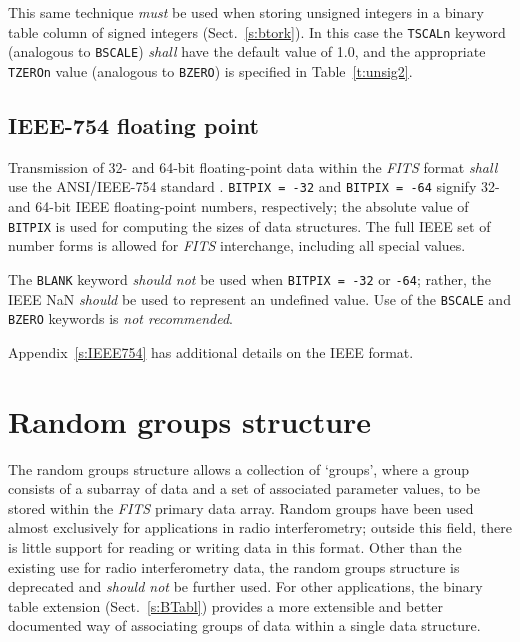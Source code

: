 \documentclass[onecolumn]{aa}
\begin{document}
This same technique {\em must} be used when storing unsigned
integers in a binary table column of signed integers (Sect.\ \ref{s:btork}).  
In this case the {\tt TSCALn} keyword (analogous to {\tt BSCALE}) 
{\em shall} have the default value of 1.0,
and the appropriate {\tt TZEROn} value (analogous to {\tt BZERO})
is specified in Table~\ref{t:unsig2}.

  \subsection{IEEE-754 floating point}
\label{s:FloatingPoint}
    Transmission of 32- and 64-bit floating-point
    data within the {\em FITS\/} 
    format {\em shall} use the ANSI/IEEE-754 standard \citep{ieee85}.
    {\tt BITPIX~=~-32} and 
    {\tt BITPIX~=~-64} signify 32- and 64-bit IEEE 
    floating-point
    numbers, respectively; the absolute value of {\tt BITPIX} 
    is
    used for computing the sizes of data structures. The full 
    IEEE set of number forms is allowed for {\em FITS\/} 
    interchange, including all special
    values.

    The {\tt BLANK} keyword
    {\em should not} be used when {\tt BITPIX~=~-32} or
    {\tt -64}; rather, the IEEE NaN {\em should} be used to represent an
    undefined value.  Use of the {\tt BSCALE} and {\tt BZERO}
    keywords is {\em not recommended}. 

    Appendix~\ref{s:IEEE754} has additional details on the IEEE format.
   

\section{Random groups structure}
    \label{s:Rgrp}

The random groups structure allows a collection of `groups', where a
group consists of a subarray of data and a set of associated
parameter values, to be stored within the {\em FITS} primary data
array.  Random groups have been used almost
exclusively for applications in radio interferometry; outside this
field,  there is little support for reading or writing data in this
format.   Other than the existing use for radio interferometry data,
the random groups structure  is deprecated  and 
{\em should not} be further used. For other applications, the binary table
  extension (Sect.\ \ref{s:BTabl}) provides a
more extensible and better documented way of associating groups of
data within a single data structure.
\end{document}
